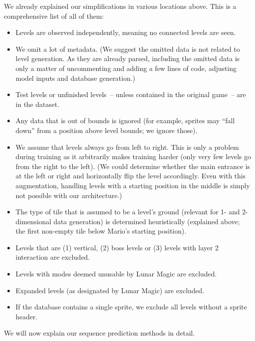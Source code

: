 We already explained our simplifications in various locations above.
This is a comprehensive list of all of them:
\begin{itemize}
\item Levels are observed independently, meaning no connected levels
  are seen.
\item We omit a lot of metadata. (We suggest the omitted data is not
  related to level generation. As they are already parsed, including
  the omitted data is only a matter of uncommenting and adding a few
  lines of code, adjusting model inputs and database generation.)
\item Test levels or unfinished levels~-- unless contained in the
  original game~-- are in the dataset.
\item Any data that is out of bounds is ignored (for example, sprites
  may ``fall down'' from a position above level bounds; we ignore
  those).
\item We assume that levels always go from left to right. This is only
  a problem during training as it arbitrarily makes training harder
  (only very few levels go from the right to the left). (We could
  determine whether the main entrance is at the left or right and
  horizontally flip the level accordingly. Even with this
  augmentation, handling levels with a starting position in the middle
  is simply not possible with our architecture.)
\item The type of tile that is assumed to be a level's ground
  (relevant for 1- and 2-dimensional data generation) is determined
  heuristically (explained above; the first non-empty tile below
  Mario's starting position).
\item Levels that are (1) vertical, (2) boss levels or (3)
  levels with layer 2 interaction are excluded.
\item Levels with modes deemed unusable by Lunar Magic are excluded.
\item Expanded levels (as designated by Lunar Magic) are excluded.
\item If the database contains a single sprite, we exclude all levels
  without a sprite header.
\end{itemize}

We will now explain our sequence prediction methods in detail.


